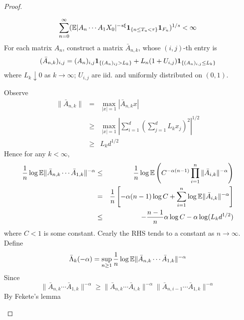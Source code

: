 \documentclass{article}
\theoremstyle{remark}
\begin{document}
\begin{proof}
\begin{enumerate}
    \begin{equation}
      \label{eq:sum_on_F_n}
      \sum_{n=0}^\infty
      (\mathbb{E} |A_n \cdots A_1 X_0|^{-s\xi}\mathbf{1}_{\{n \leq T_u < \tau\}}
      \mathbf{1}_{F_n})^{1/s} < \infty
    \end{equation}
    For each matrix $A_n$, construct a matrix $\bar A_{n, k}$, whose
    $(i,j)$-th entry is
    \begin{equation*}
      (\bar A_{n,k})_{i,j} = (A_n)_{i,j}\mathbf{1}_{\{(A_n)_{ij} > L_k\}} +
      L_n (1 + U_{i,j})\mathbf{1}_{\{(A_n)_{i,j} \leq L_k\}}
    \end{equation*}
    where $L_k \downarrow 0$ as $k \to \infty$; $U_{i,j}$ are
    iid. and uniformly distributed on $(0,1)$.

    Observe
    \begin{eqnarray*}
      \|\bar A_{n,k}\|
      &=&
      \max_{|x| = 1} |\bar A_{n,k} x| \\
      &\geq&
      \max_{|x| = 1}
      \left|
        \sum_{i=1}^d \left(\sum_{j=1}^d L_k x_j \right)^2
      \right|^{1/2} \\
      &\geq& L_k d^{1/2}
    \end{eqnarray*}
    Hence for any $k < \infty$,
    \begin{eqnarray*}
      {1 \over n}
      \log \mathbb{E}
      \|\bar A_{n,k} \cdots \bar A_{1,k}\|^{-\alpha}
      &\leq&
             {1 \over n} \log \mathbb{E} \left(
             C^{-\alpha(n-1)} \prod_{i=1}^n \|\bar A_{i,k}\|^{-\alpha}
             \right) \\
      &=& {1 \over n} \left[
          -\alpha(n-1) \log C
          + \sum_{i=1}^n \log \mathbb{E} \|\bar A_{i,k}\|^{-\alpha}
          \right] \\
      &\leq&
          -{n - 1 \over n} \alpha \log C
          -\alpha \log (L_k d^{1/2})
    \end{eqnarray*}
    where $C < 1$ is some constant. Cearly the RHS tends to a constant
    as $n \to \infty$. Define
    \begin{equation*}
      \bar \Lambda_{k}(-\alpha) = \sup_{n \geq 1} {1 \over n} \log
      \mathbb{E}\|\bar A_{n,k} \cdots \bar A_{1,k}\|^{-\alpha}
    \end{equation*}
    Since
    \begin{equation*}
      \|\bar A_{n,k} \cdots \bar A_{1,k}\|^{-\alpha}
      \geq
      \|\bar A_{n,k} \cdots \bar A_{i,k}\|^{-\alpha}
      \|\bar A_{n,i-1} \cdots \bar A_{1,k}\|^{-\alpha}
    \end{equation*}
    By Fekete's lemma
    \begin{equation*}

\end{equation*}
\end{enumerate}
\end{proof}
\end{document}
